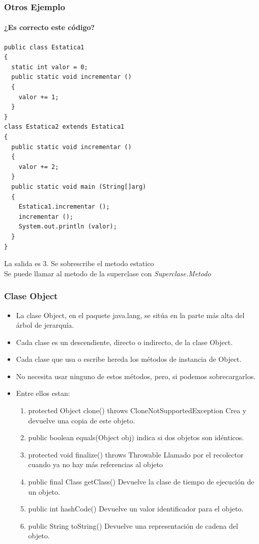 \documentclass{beamer}
\begin{document}
\begin{frame}[fragile]
    \frametitle{Otros Ejemplo}
    \framesubtitle{¿Es correcto este código?}
   \begin{scriptsize}
\begin{verbatim}
public class Estatica1
{
  static int valor = 0;
  public static void incrementar ()
  {
    valor += 1;
  }
}
class Estatica2 extends Estatica1
{
  public static void incrementar ()
  {
    valor += 2;
  }
  public static void main (String[]arg)
  {
    Estatica1.incrementar ();
    incrementar ();
    System.out.println (valor);
  }
}
\end{verbatim} 
\pause
\begin{center}
\alert{La salida es 3. Se sobrescribe el metodo estatico}\\
\pause
\alert{Se puede llamar al metodo de la superclase con \emph{Superclase.Metodo}}
\end{center}
\end{scriptsize}

\end{frame}


\begin{frame}
    \frametitle{Clase Object}
\begin{footnotesize}
\begin{itemize}[<+->]
\item La clase Object, en el paquete java.lang, se sitúa en la parte más alta del árbol de jerarquía.
\item Cada clase es un descendiente, directo o indirecto, de la clase Object.
\item Cada clase que usa o escribe hereda los métodos de instancia de Object.
\item No necesita usar ninguno de estos métodos, pero, si podemos sobrecargarlos.
\item Entre ellos estan:
\begin{enumerate}
\item \alert{protected Object clone() throws CloneNotSupportedException}  Crea y devuelve una copia de este objeto.
\item \alert{public boolean equals(Object obj)} indica si dos objetos son idénticos.
\item \alert{protected void finalize() throws Throwable} Llamado por el recolector cuando ya no hay más referencias al objeto 
\item \alert{public final Class getClass()} Devuelve la clase de tiempo de ejecución de un objeto.
\item \alert{public int hashCode()} Devuelve un valor identificador para el objeto.
\item \alert{public String toString()} Devuelve una representación de cadena del objeto.
\end{enumerate}
\end{itemize}
\end{footnotesize}

\end{frame}
\end{document}
